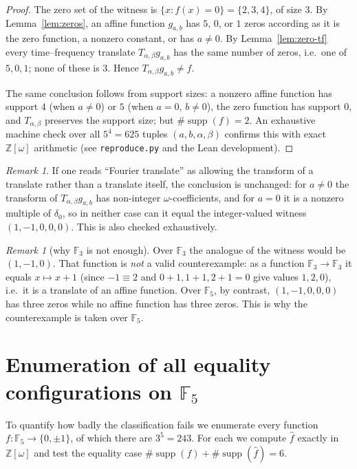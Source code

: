 \documentclass[11pt]{article}
\theoremstyle{definition}
\theoremstyle{remark}
\newtheorem{remark}[theorem]{Remark}
\newcommand{\F}{\mathbb{F}}
\newcommand{\Z}{\mathbb{Z}}
\newcommand{\supp}{\operatorname{supp}}
\newcommand{\fh}{\widehat{f}}
\begin{document}
\begin{proof}
The zero set of the witness is $\{x : f(x)=0\}=\{2,3,4\}$, of size $3$. By
Lemma~\ref{lem:zeros}, an affine function $g_{a,b}$ has $5$, $0$, or $1$ zeros
according as it is the zero function, a nonzero constant, or has $a\ne0$. By
Lemma~\ref{lem:zero-tf} every time--frequency translate $T_{\alpha,\beta}
g_{a,b}$ has the same number of zeros, i.e.\ one of $5,0,1$; none of these is
$3$. Hence $T_{\alpha,\beta}g_{a,b}\ne f$.

The same conclusion follows from support sizes: a nonzero affine function has
support $4$ (when $a\ne0$) or $5$ (when $a=0$, $b\ne0$), the zero function has
support $0$, and $T_{\alpha,\beta}$ preserves the support size; but
$\#\supp(f)=2$. An exhaustive machine check over all $5^4=625$ tuples
$(a,b,\alpha,\beta)$ confirms this with exact $\Z[\omega]$ arithmetic (see
\texttt{reproduce.py} and the Lean development).
\end{proof}

\begin{remark}
If one reads ``Fourier translate'' as allowing the transform of a translate
rather than a translate itself, the conclusion is unchanged: for $a\ne0$ the
transform of $T_{\alpha,\beta}g_{a,b}$ has non-integer $\omega$-coefficients,
and for $a=0$ it is a nonzero multiple of $\delta_0$, so in neither case can it
equal the integer-valued witness $(1,-1,0,0,0)$. This is also checked
exhaustively.
\end{remark}

\begin{remark}[why $\F_3$ is not enough]
Over $\F_3$ the analogue of the witness would be $(1,-1,0)$. That function is
\emph{not} a valid counterexample: as a function $\F_3\to\F_3$ it equals
$x\mapsto x+1$ (since $-1\equiv2$ and $0+1,1+1,2+1=0$ give values $1,2,0$),
i.e.\ it is a translate of an affine function. Over $\F_5$, by contrast,
$(1,-1,0,0,0)$ has three zeros while no affine function has three zeros. This
is why the counterexample is taken over $\F_5$.
\end{remark}

\section{Enumeration of all equality configurations on $\F_5$}

To quantify how badly the classification fails we enumerate every function
$f:\F_5\to\{0,\pm1\}$, of which there are $3^5=243$. For each we compute
$\fh$ exactly in $\Z[\omega]$ and test the equality case
$\#\supp(f)+\#\supp(\fh)=6$.
\end{document}
